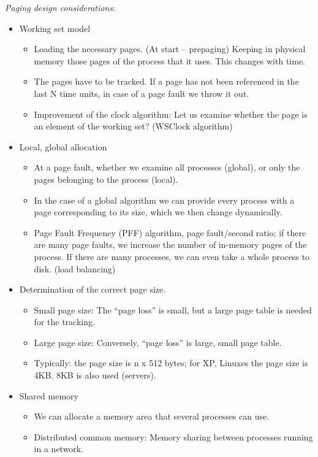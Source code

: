 \documentclass[margin=0px]{article}
\begin{document}
\textit{Paging design considerations}:
\begin{itemize}
    \item Working set model
          \begin{itemize}
              \item Loading the necessary pages. (At start -- prepaging) Keeping in physical memory those pages of the process that it uses. This changes with time.
              \item The pages have to be tracked. If a page has not been referenced in the last N time units, in case of a page fault we throw it out.
              \item Improvement of the clock algorithm: Let us examine whether the page is an element of the working set? (WSClock algorithm)
          \end{itemize}
    \item Local, global allocation
          \begin{itemize}
              \item At a page fault, whether we examine all processes (global), or only the pages belonging to the process (local).
              \item In the case of a global algorithm we can provide every process with a page corresponding to its size, which we then change dynamically.
              \item Page Fault Frequency (PFF) algorithm, page fault/second ratio; if there are many page faults, we increase the number of in-memory pages of the process. If there are many processes, we can even take a whole process to disk. (load balancing)
          \end{itemize}
    \item Determination of the correct page size.
          \begin{itemize}
              \item Small page size: The ``page loss'' is small, but a large page table is needed for the tracking.
              \item Large page size: Conversely, ``page loss'' is large, small page table.
              \item Typically: the page size is n x 512 bytes; for XP, Linuxes the page size is 4KB. 8KB is also used (servers).
          \end{itemize}
    \item Shared memory
          \begin{itemize}
              \item We can allocate a memory area that several processes can use.
              \item Distributed common memory: Memory sharing between processes running in a network.
          \end{itemize}
\end{itemize}
\end{document}
